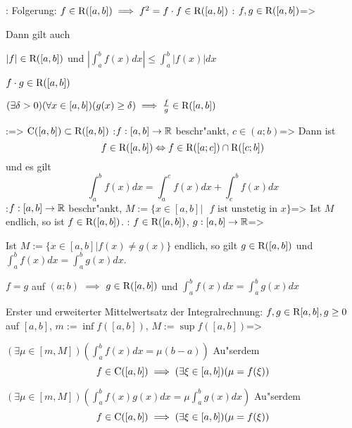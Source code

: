 \remark:{
  Folgerung: $f\in{\rm R}([a,b])\implies f^2=f\cdot f\in{\rm R}([a,b])$
  }
\theorem: $f,g\in{\rm R}([a,b])$=>{
  Dann gilt auch 
  \begin{stmts}
    \item $|f|\in{\rm R}([a,b])$ und $\left|\int_a^b f(x)dx\right|\le \int_a^b |f(x)|dx$ 
    \item $f\cdot g\in{\rm R}([a,b])$
    \item $(\exists\delta>0)(\forall x\in[a,b])(g(x)\ge\delta)
         \implies\frac f g\in{\rm R}([a,b])$
    \end{stmts}
  }
\theorem:=>{
  ${\rm C}([a,b])\subset{\rm R}([a,b])$
  }
\theorem:$f:[a,b]\to\mathbb R$ beschr"ankt, $c\in(a;b)$=>{
  Dann ist 
  \[f\in{\rm R}([a,b])\Leftrightarrow f\in{\rm R}([a;c])\cap{\rm R}([c;b])
    \]
  und es gilt
  \[\int_a^b f(x) dx=\int_a^c f(x) dx+\int_c^b f(x) dx
    \]
  }
\theorem:$f:[a,b]\to\mathbb R$ beschr"ankt, 
  $M:=\{x\in[a,b]|\text{ $f$ ist unstetig in $x$}\}$=>{
  Ist $M$ endlich, so ist $f\in{\rm R}([a,b])$.
  }
\theorem:
  $f\in{\rm R}([a,b])$, $g:[a,b]\to\mathbb R$=>{
  \begin{stmts}
    \item Ist $M:=\{x\in[a,b]|f(x)\ne g(x)\}$ endlich, so gilt 
      $g\in{\rm R}([a,b])$ und $\int_a^b f(x)dx=\int_a^b g(x)dx$.
    \item $f=g$ auf $(a;b)$ $\implies$ $g\in{\rm R}([a,b])$ und 
      $\int_a^b f(x)dx=\int_a^b g(x)dx$
    \end{stmts}
  }
\theorem Erster und erweiterter Mittelwertsatz der Integralrechnung:
  $f,g\in{\rm R}[a,b],g\ge 0$ auf $[a,b]$, $m:=\inf f([a,b])$, $M:=\sup f([a,b])$=>{
  \begin{stmts}
    \item $(\exists \mu\in[m,M])(\int_a^b f(x)dx=\mu(b-a))$ 
      Au"serdem
      \[f\in{\rm C}([a,b])\implies (\exists\xi\in[a,b])(\mu=f(\xi))
        \]
    \item $(\exists \mu\in[m,M])(\int_a^b f(x)g(x) dx=\mu\int_a^b g(x)dx)$ 
      Au"serdem
      \[f\in{\rm C}([a,b])\implies (\exists\xi\in[a,b])(\mu=f(\xi))
        \]
    \end{stmts}
  }
